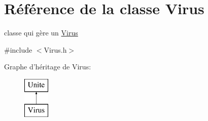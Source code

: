 \hypertarget{classVirus}{
\section{Référence de la classe Virus}
\label{classVirus}
}


classe qui gère un \hyperlink{classVirus}{Virus}  




{\ttfamily \#include $<$Virus.h$>$}

Graphe d'héritage de Virus:\begin{figure}[H]
\begin{center}
\leavevmode
\includegraphics[height=2.000000cm]{classVirus}
\end{center}
\end{figure}
